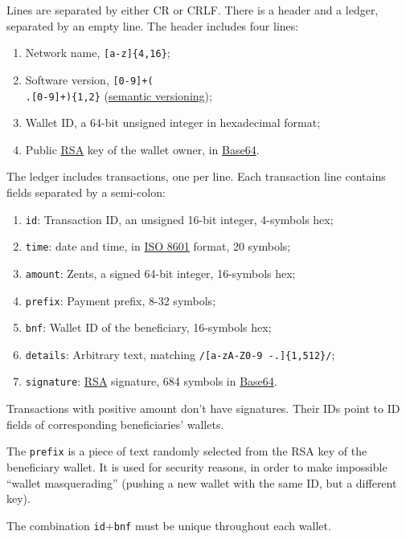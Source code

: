 \documentclass[11pt,oneside]{article}
\newcommand\dd[1]{\colorbox{gray!30}{\texttt{#1}}}
\begin{document}
Lines are separated by either CR or CRLF.
There is a header and a ledger, separated by an empty line.
The header includes four lines:

\begin{enumerate}
  \item Network name, \dd{[a-z]\{4,16\}};
  \item Software version, \dd{[0-9]+(\\.[0-9]+)\{1,2\}} (\href{https://semver.org/}{semantic versioning});
  \item Wallet ID, a 64-bit unsigned integer in hexadecimal format;
  \item Public \href{https://en.wikipedia.org/wiki/RSA_(cryptosystem)}{RSA}
    key of the wallet owner, in \href{https://en.wikipedia.org/wiki/Base64}{Base64}.
\end{enumerate}

The ledger includes transactions, one per line. Each transaction line
contains fields separated by a semi-colon:

\begin{enumerate}
  \item \dd{id}: Transaction ID, an unsigned 16-bit integer, 4-symbols hex;
  \item \dd{time}: date and time, in \href{https://en.wikipedia.org/wiki/ISO_8601}{ISO 8601} format, 20 symbols;
  \item \dd{amount}: Zents, a signed 64-bit integer, 16-symbols hex;
  \item \dd{prefix}: Payment prefix, 8-32 symbols;
  \item \dd{bnf}: Wallet ID of the beneficiary, 16-symbols hex;
  \item \dd{details}: Arbitrary text, matching \dd{/[a-zA-Z0-9 -.]\{1,512\}/};
  \item \dd{signature}: \href{https://en.wikipedia.org/wiki/RSA_(cryptosystem)}{RSA} signature,
    684 symbols in \href{https://en.wikipedia.org/wiki/Base64}{Base64}.
\end{enumerate}

Transactions with positive amount don't have signatures.
Their IDs point to ID fields of corresponding beneficiaries' wallets.

The \dd{prefix} is a piece of text randomly selected from the RSA key
of the beneficiary wallet. It is used for security reasons, in order
to make impossible ``wallet masquerading'' (pushing a new wallet with the
same ID, but a different key).

The combination \dd{id}+\dd{bnf} must be unique throughout each wallet.
\end{document}

